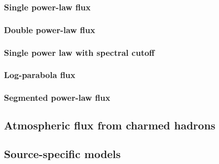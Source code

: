 \subsubsection{Single power-law flux\label{sec:spl}}
\begingroup
\graphicspath{{results/HESE_Final_Paper/}}

\endgroup

\subsubsection{Double power-law flux\label{sec:dpl}}
\begingroup
\graphicspath{{results/HESE_Final_Paper/}}

\endgroup

\subsubsection{Single power law with spectral cutoff\label{sec:cutoff}}
\begingroup
\graphicspath{{results/HESE_Final_Paper/}}

\endgroup

\subsubsection{Log-parabola flux\label{sec:log_parabola}}
\begingroup
\graphicspath{{results/HESE_Final_Paper/}}

\endgroup

\subsubsection{Segmented power-law flux\label{sec:unfolding}}
\begingroup
\graphicspath{{results/HESE_Final_Paper/}}

\endgroup

\subsection{Atmospheric flux from charmed hadrons\label{sec:prompt}}
\begingroup
\graphicspath{{results/HESE_Final_Paper/}}

\endgroup

\subsection{Source-specific models\label{sec:specific_models}}
\begingroup
\graphicspath{{results/HESE_Final_Paper/}}

\endgroup
